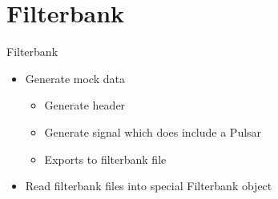 \documentclass{beamer}
\begin{document}
\section{Filterbank}
\begin{frame}{Filterbank}
	\begin{itemize}
		\item Generate mock data
		\begin{itemize}
			\item Generate header
			\item Generate signal which does include a Pulsar
			\item Exports to filterbank file
		\end{itemize}
		\item Read filterbank files into special Filterbank object
	\end{itemize}
\end{frame}
\end{document}
